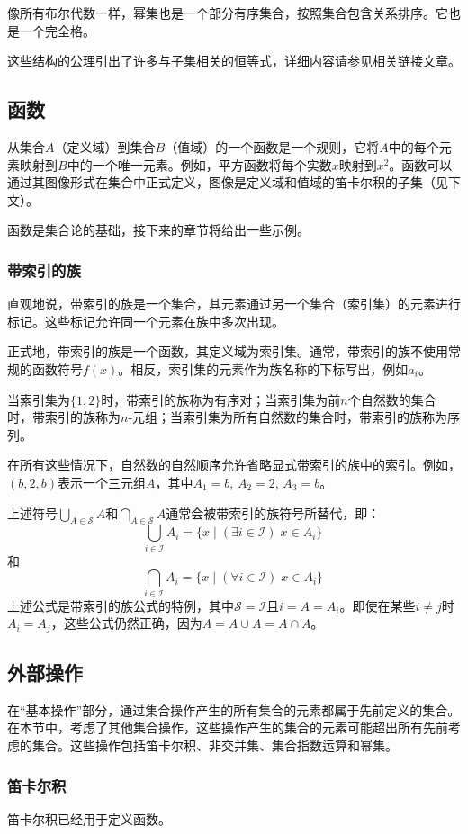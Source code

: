 像所有布尔代数一样，幂集也是一个部分有序集合，按照集合包含关系排序。它也是一个完全格。

这些结构的公理引出了许多与子集相关的恒等式，详细内容请参见相关链接文章。
\subsection{函数}
从集合\( A \)（定义域）到集合\( B \)（值域）的一个函数是一个规则，它将\( A \)中的每个元素映射到\( B \)中的一个唯一元素。例如，平方函数将每个实数\( x \)映射到\( x^2 \)。函数可以通过其图像形式在集合中正式定义，图像是定义域和值域的笛卡尔积的子集（见下文）。

函数是集合论的基础，接下来的章节将给出一些示例。
\subsubsection{带索引的族}

直观地说，带索引的族是一个集合，其元素通过另一个集合（索引集）的元素进行标记。这些标记允许同一个元素在族中多次出现。

正式地，带索引的族是一个函数，其定义域为索引集。通常，带索引的族不使用常规的函数符号\( f(x) \)。相反，索引集的元素作为族名称的下标写出，例如\( a_i \)。

当索引集为\( \{1, 2\} \)时，带索引的族称为有序对；当索引集为前\( n \)个自然数的集合时，带索引的族称为\( n \)-元组；当索引集为所有自然数的集合时，带索引的族称为序列。

在所有这些情况下，自然数的自然顺序允许省略显式带索引的族中的索引。例如，\( (b, 2, b) \)表示一个三元组\( A \)，其中\( A_1 = b \), \( A_2 = 2 \), \( A_3 = b \)。

上述符号\( \bigcup_{A \in \mathcal{S}} A \)和\( \bigcap_{A \in \mathcal{S}} A \)通常会被带索引的族符号所替代，即：
\[
\bigcup_{i \in \mathcal{I}} A_i = \{x \mid (\exists i \in \mathcal{I}) \; x \in A_i\}~
\]
和
\[
\bigcap_{i \in \mathcal{I}} A_i = \{x \mid (\forall i \in \mathcal{I}) \; x \in A_i\}~
\]
上述公式是带索引的族公式的特例，其中\( \mathcal{S} = \mathcal{I} \)且\( i = A = A_i \)。即使在某些\( i \neq j \)时\( A_i = A_j \)，这些公式仍然正确，因为\( A = A \cup A = A \cap A \)。
\subsection{外部操作}
在“基本操作”部分，通过集合操作产生的所有集合的元素都属于先前定义的集合。在本节中，考虑了其他集合操作，这些操作产生的集合的元素可能超出所有先前考虑的集合。这些操作包括笛卡尔积、非交并集、集合指数运算和幂集。
\subsubsection{笛卡尔积}
笛卡尔积已经用于定义函数。

